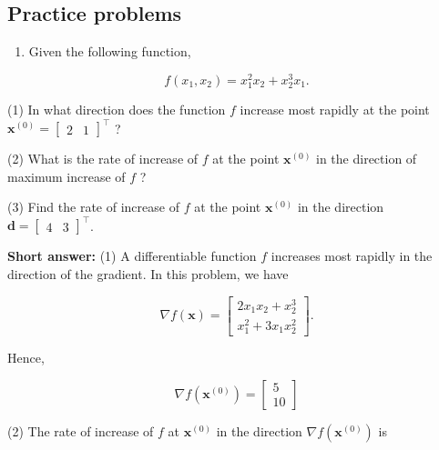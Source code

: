 \subsection{Practice problems}
\begin{enumerate}
	\item Given the following function,
\end{enumerate}

\begin{equation*}
	f\left(x_{1}, x_{2}\right)=x_{1}^{2} x_{2}+x_{2}^{3} x_{1} .
\end{equation*}

(1) In what direction does the function \(f\) increase most rapidly at the point \(\boldsymbol{x}^{(0)}=\left[\begin{array}{ll}2 & 1\end{array}\right]^{\top}\) ?

(2) What is the rate of increase of \(f\) at the point \(\boldsymbol{x}^{(0)}\) in the direction of maximum increase of \(f\) ?

(3) Find the rate of increase of \(f\) at the point \(\boldsymbol{x}^{(0)}\) in the direction \(\boldsymbol{d}=\left[\begin{array}{ll}4 & 3\end{array}\right]^{\top}\).

\textbf{Short answer:}
(1) A differentiable function \(f\) increases most rapidly in the direction of the gradient. In this problem, we have

\begin{equation*}
	\nabla f(\boldsymbol{x})=\left[\begin{array}{l}
		2 x_{1} x_{2}+x_{2}^{3} \\
		x_{1}^{2}+3 x_{1} x_{2}^{2}
	\end{array}\right] .
\end{equation*}

Hence,

\begin{equation*}
	\nabla f\left(\boldsymbol{x}^{(0)}\right)=\left[\begin{array}{c}
		5 \\
		10
	\end{array}\right]
\end{equation*}

(2) The rate of increase of \(f\) at \(\boldsymbol{x}^{(0)}\) in the direction \(\nabla f\left(\boldsymbol{x}^{(0)}\right)\) is

